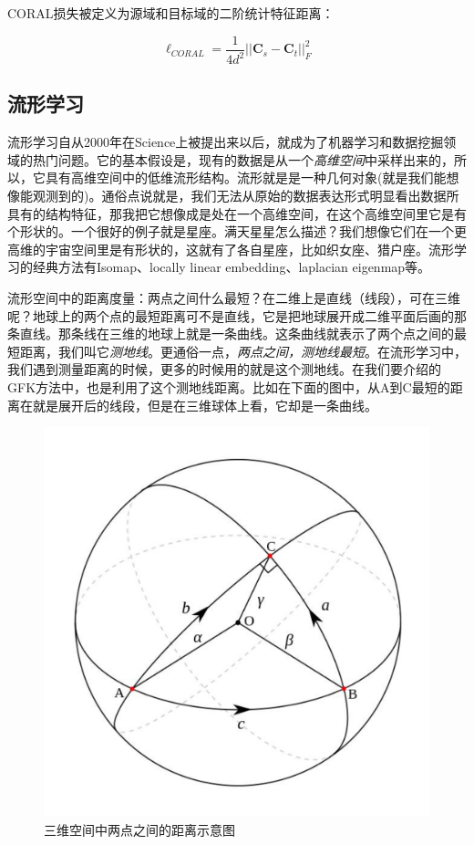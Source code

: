 CORAL损失被定义为源域和目标域的二阶统计特征距离：

\begin{equation}
	\ell_{CORAL} = \frac{1}{4d^2} ||\mathbf{C}_s - \mathbf{C}_t||^2_F
\end{equation}

\subsection{流形学习}

流形学习自从2000年在Science上被提出来以后，就成为了机器学习和数据挖掘领域的热门问题。它的基本假设是，现有的数据是从一个\textit{高维空间}中采样出来的，所以，它具有高维空间中的低维流形结构。流形就是是一种几何对象(就是我们能想像能观测到的)。通俗点说就是，我们无法从原始的数据表达形式明显看出数据所具有的结构特征，那我把它想像成是处在一个高维空间，在这个高维空间里它是有个形状的。一个很好的例子就是星座。满天星星怎么描述？我们想像它们在一个更高维的宇宙空间里是有形状的，这就有了各自星座，比如织女座、猎户座。流形学习的经典方法有Isomap、locally linear embedding、laplacian eigenmap等。

流形空间中的距离度量：两点之间什么最短？在二维上是直线（线段），可在三维呢？地球上的两个点的最短距离可不是直线，它是把地球展开成二维平面后画的那条直线。那条线在三维的地球上就是一条曲线。这条曲线就表示了两个点之间的最短距离，我们叫它\textit{测地线}。更通俗一点，\textit{两点之间，测地线最短}。在流形学习中，我们遇到测量距离的时候，更多的时候用的就是这个测地线。在我们要介绍的GFK方法中，也是利用了这个测地线距离。比如在下面的图中，从A到C最短的距离在就是展开后的线段，但是在三维球体上看，它却是一条曲线。

\begin{figure}[htbp]
	\centering
	\includegraphics[scale=0.4]{./figures/fig-subspace-earth.pdf}
	\caption{三维空间中两点之间的距离示意图}
	\label{fig-subspace-earth}
\end{figure}

